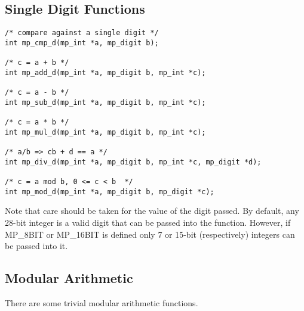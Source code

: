 \documentclass{article}
\begin{document}
\subsection{Single Digit Functions}

\begin{verbatim}
/* compare against a single digit */
int mp_cmp_d(mp_int *a, mp_digit b);

/* c = a + b */
int mp_add_d(mp_int *a, mp_digit b, mp_int *c);

/* c = a - b */
int mp_sub_d(mp_int *a, mp_digit b, mp_int *c);

/* c = a * b */
int mp_mul_d(mp_int *a, mp_digit b, mp_int *c);

/* a/b => cb + d == a */
int mp_div_d(mp_int *a, mp_digit b, mp_int *c, mp_digit *d);

/* c = a mod b, 0 <= c < b  */
int mp_mod_d(mp_int *a, mp_digit b, mp_digit *c);
\end{verbatim}

Note that care should be taken for the value of the digit passed.  By default, any 28-bit integer is a valid digit that can
be passed into the function.  However, if MP\_8BIT or MP\_16BIT is defined only 7 or 15-bit (respectively) integers 
can be passed into it.

\subsection{Modular Arithmetic}

There are some trivial modular arithmetic functions.
\end{document}
